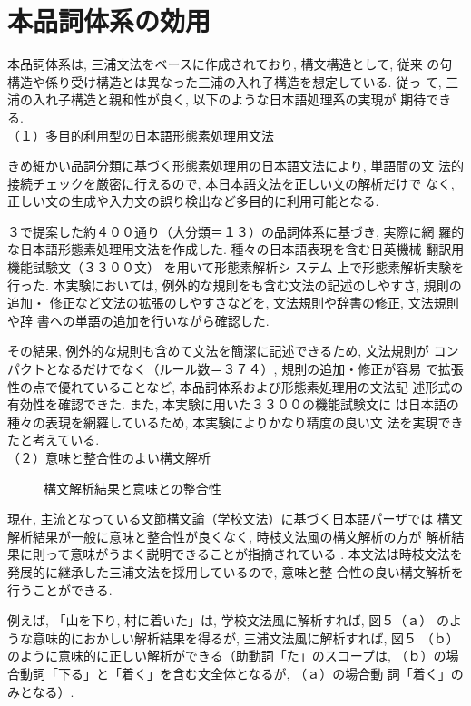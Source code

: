 \section{本品詞体系の効用}

 本品詞体系は, 三浦文法をベースに作成されており, 構文構造として, 従来
の句構造や係り受け構造とは異なった三浦の入れ子構造を想定している. 従っ
て, 三浦の入れ子構造と親和性が良く, 以下のような日本語処理系の実現が
期待できる. \\
（１）多目的利用型の日本語形態素処理用文法

きめ細かい品詞分類に基づく形態素処理用の日本語文法により, 単語間の文
法的接続チェックを厳密に行えるので, 本日本語文法を正しい文の解析だけで
なく, 正しい文の生成や入力文の誤り検出など多目的に利用可能となる.

３で提案した約４００通り（大分類＝１３）の品詞体系に基づき, 実際に網
羅的な日本語形態素処理用文法を作成した. 種々の日本語表現を含む日英機械
翻訳用機能試験文（３３００文）\cite{Ikehara1990} を用いて形態素解析シ
ステム\cite{Takahashi1993} 上で形態素解析実験を行った. 
本実験においては, 例外的な規則をも含む文法の記述のしやすさ, 規則の追加・
修正など文法の拡張のしやすさなどを, 文法規則や辞書の修正, 文法規則や辞
書への単語の追加を行いながら確認した.

 その結果, 例外的な規則も含めて文法を簡潔に記述できるため, 文法規則が
コンパクトとなるだけでなく（ルール数＝３７４）, 規則の追加・修正が容易
で拡張性の点で優れていることなど, 本品詞体系および形態素処理用の文法記
述形式の有効性を確認できた. また, 本実験に用いた３３００の機能試験文に
は日本語の種々の表現を網羅しているため, 本実験によりかなり精度の良い文
法を実現できたと考えている. \\
（２）意味と整合性のよい構文解析
\begin{figure}
\begin{center}
	
	
	
\end{center}
\caption{構文解析結果と意味との整合性}
\label{fig:syntax}
\end{figure}

現在, 主流となっている文節構文論（学校文法）に基づく日本語パーザでは
構文解析結果が一般に意味と整合性が良くなく, 時枝文法風の構文解析の方が
解析結果に則って意味がうまく説明できることが指摘されている
\cite{Mizutani1993}.
本文法は時枝文法を発展的に継承した三浦文法を採用しているので, 意味と整
合性の良い構文解析を行うことができる.

 例えば, 「山を下り, 村に着いた」は, 学校文法風に解析すれば, 図５（ａ）
のような意味的におかしい解析結果を得るが, 三浦文法風に解析すれば, 図５
（ｂ）のように意味的に正しい解析ができる（助動詞「た」のスコープは, 
（ｂ）の場合動詞「下る」と「着く」を含む文全体となるが, （ａ）の場合動
詞「着く」のみとなる）. 


